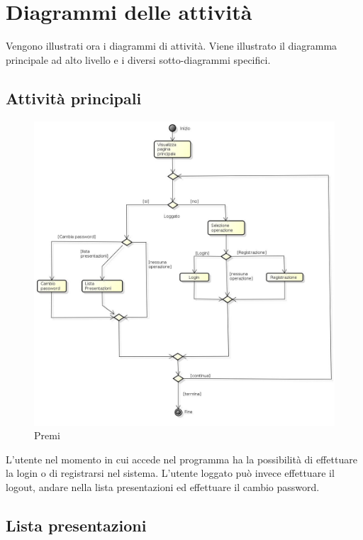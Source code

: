 \section{Diagrammi delle attività}
Vengono illustrati ora i diagrammi di attività. Viene illustrato il diagramma principale ad alto livello e i diversi sotto-diagrammi specifici.

\newpage

\subsection{Attività principali}

\begin{figure}[h!]
		\centering
		\includegraphics[scale=.4]{img/Premi.jpg}
		\caption{Premi}
		\label{fig:Attivita_principali}
\end{figure}

L'utente nel momento in cui accede nel programma ha la possibilità di effettuare la login o di registrarsi nel sistema. 
L'utente loggato può invece effettuare il logout, andare nella lista presentazioni ed effettuare il cambio password.

\subsection{Lista presentazioni}

